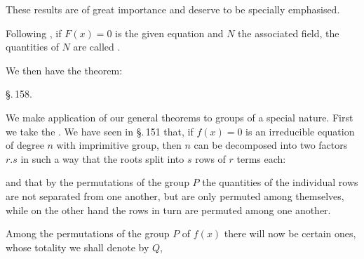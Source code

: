
These results are of great importance and deserve to be
specially emphasised.

Following , if $F(x) = 0$ is the given
equation and $N$ the associated  field, the quantities of
$N$ are called .

We then have the theorem:


\begin{center}
\S.\,158.

\end{center}

We make application of our general theorems to groups of a
special nature. First we take the . We have
seen in \S.\,151 that, if $f(x) = 0$ is an irreducible equation
of degree $n$ with imprimitive group, then $n$ can be decomposed
into two factors $r \boldsymbol{.} s$ in such a way that the
roots split into $s$ rows of $r$ terms each:


and that by the permutations of the group $P$ the quantities of
the individual rows are not separated from one another, but are
only permuted among themselves, while on the other hand the
rows in turn are permuted among one another.

Among the permutations of the  group $P$ of $f(x)$
there will now be certain ones, whose totality we shall denote by $Q$,
